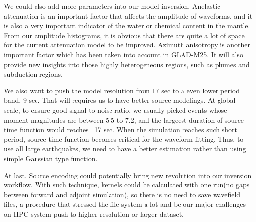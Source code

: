 We could also add more parameters into our model inversion.
Anelastic attenuation is an important factor that affects
the amplitude of waveforms, and it is also a very important
indicator of the water or chemical content in the mantle.
From our amplitude histograms, it is obvious that 
there are quite a lot of space for the current attenuation model to be improved.
Azimuth anisotropy is another important factor which has been taken
into account in GLAD-M25. It will also provide new insights
into those highly heterogeneous regions, such as plumes and subduction regions.

We also want to push the model resolution from 17 sec to a even lower period band,
9 sec. That will requires us
to have better source modelings. At global scale,
to ensure good signal-to-noise ratio, we usually picked events whose moment
magnitudes are between 5.5 to 7.2, and the largeest duration of source
time function would reaches ~17 sec.
When the simulation reaches such short period, source time function
becomes critical for the waveform fitting. Thus, to use all large earthquakes,
we need to have a better estimation rather than using
simple Gaussian type function.

At last, Source encoding could potentially bring new revolution into our inversion workflow.
With such technique, kernels could be calculated with one run(no gaps between forward and adjoint
simulation), so there is no need to save wavefield files, a procedure that stressed the file system
a lot and be our major challenges on HPC system push to higher resolution or larger dataset.
